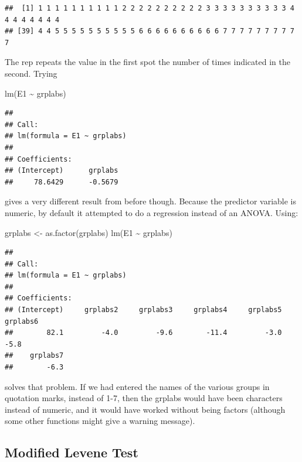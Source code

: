 \documentclass[
]{book}
\newenvironment{Shaded}{\begin{snugshade}}{\end{snugshade}}
\newcommand{\FunctionTok}[1]{\textcolor[rgb]{0.00,0.00,0.00}{#1}}
\newcommand{\NormalTok}[1]{#1}
\newcommand{\OtherTok}[1]{\textcolor[rgb]{0.56,0.35,0.01}{#1}}
\newcommand{\SpecialCharTok}[1]{\textcolor[rgb]{0.00,0.00,0.00}{#1}}
\begin{document}
\begin{verbatim}
##  [1] 1 1 1 1 1 1 1 1 1 1 2 2 2 2 2 2 2 2 2 2 3 3 3 3 3 3 3 3 3 3 4 4 4 4 4 4 4 4
## [39] 4 4 5 5 5 5 5 5 5 5 5 5 6 6 6 6 6 6 6 6 6 6 7 7 7 7 7 7 7 7 7 7
\end{verbatim}

The rep repeats the value in the first spot the number of times indicated in the second. Trying

\begin{Shaded}
\begin{Highlighting}[]
\FunctionTok{lm}\NormalTok{(E1 }\SpecialCharTok{\textasciitilde{}}\NormalTok{ grplabs)}
\end{Highlighting}
\end{Shaded}

\begin{verbatim}
## 
## Call:
## lm(formula = E1 ~ grplabs)
## 
## Coefficients:
## (Intercept)      grplabs  
##     78.6429      -0.5679
\end{verbatim}

gives a very different result from before though. Because the predictor variable is numeric, by default it attempted to do a regression instead of an ANOVA. Using:

\begin{Shaded}
\begin{Highlighting}[]
\NormalTok{grplabs }\OtherTok{\textless{}{-}} \FunctionTok{as.factor}\NormalTok{(grplabs)}
\FunctionTok{lm}\NormalTok{(E1 }\SpecialCharTok{\textasciitilde{}}\NormalTok{ grplabs)}
\end{Highlighting}
\end{Shaded}

\begin{verbatim}
## 
## Call:
## lm(formula = E1 ~ grplabs)
## 
## Coefficients:
## (Intercept)     grplabs2     grplabs3     grplabs4     grplabs5     grplabs6  
##        82.1         -4.0         -9.6        -11.4         -3.0         -5.8  
##    grplabs7  
##        -6.3
\end{verbatim}

solves that problem. If we had entered the names of the various groups in quotation marks, instead of 1-7, then the grplabs would have been characters instead of numeric, and it would have worked without being factors (although some other functions might give a warning message).

\hypertarget{modified-levene-test}{%
\subsection{Modified Levene Test}\label{modified-levene-test}}
\end{document}
